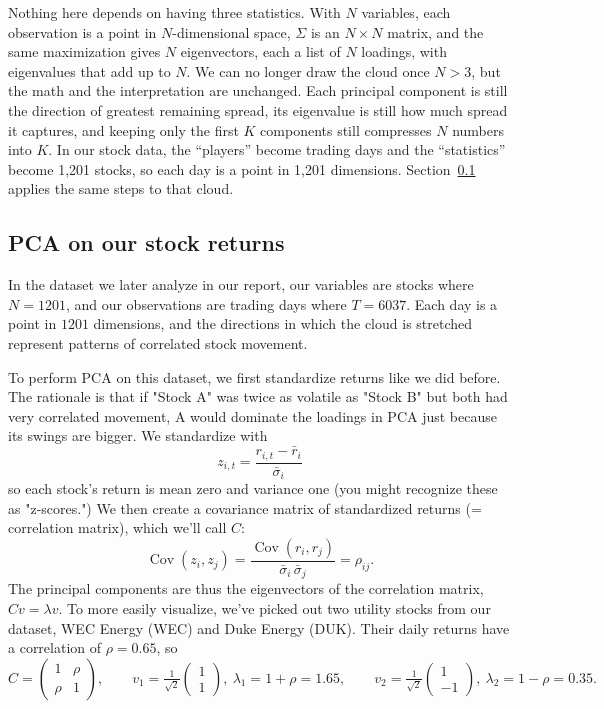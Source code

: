 \documentclass[11pt,letterpaper]{article}
\begin{document}
Nothing here depends on having three statistics. With $N$ variables, each
observation is a point in $N$-dimensional space, $\Sigma$ is an $N\times N$
matrix, and the same maximization gives $N$ eigenvectors, each a list of $N$
loadings, with eigenvalues that add up to $N$. We can no longer draw the
cloud once $N>3$, but the math and the interpretation are unchanged. Each
principal component is still the direction of greatest remaining spread, its
eigenvalue is still how much spread it captures, and keeping only the first
$K$ components still compresses $N$ numbers into $K$. In our stock data, the
``players'' become trading days and the ``statistics'' become 1,201 stocks,
so each day is a point in 1,201 dimensions. Section~\ref{sec:stock-pca}
applies the same steps to that cloud.
\subsection{PCA on our stock returns}
\label{sec:stock-pca}
In the dataset we later analyze in our report, our variables are stocks where $N = 1201$, and our observations are trading days where $T = 6037$. Each day is a point in $1201$ dimensions, and the directions in which the cloud is stretched represent patterns of correlated stock movement.

To perform PCA on this dataset, we first standardize returns like we did before. The rationale is that if  "Stock A" was twice as volatile as "Stock B" but both had very correlated movement, A would dominate the loadings in PCA just because its swings are bigger. We standardize with 
\[
z_{i,t}=\frac{r_{i,t}-\bar{r}_i}{\bar{\sigma}_i}
\]
so each stock's return is mean zero and variance one (you might recognize these as "z-scores.") We then create a covariance matrix of standardized returns (= correlation matrix), which we'll call $C$:
\[
\operatorname{Cov}(z_i,z_j)=\frac{\operatorname{Cov}(r_i,r_j)}{\bar\sigma_i\,\bar\sigma_j}=\rho_{ij}.
\]
The principal components are thus the eigenvectors of the correlation matrix, $Cv=\lambda v$. To more easily visualize, we've picked out two utility stocks from our dataset, WEC Energy (WEC) and Duke Energy (DUK). Their daily returns have a correlation of $\rho=0.65$, so
\[
C=\begin{pmatrix}1&\rho\\ \rho&1\end{pmatrix},\qquad
v_1=\tfrac{1}{\sqrt2}\begin{pmatrix}1\\1\end{pmatrix},\ \lambda_1=1+\rho=1.65,
\qquad
v_2=\tfrac{1}{\sqrt2}\begin{pmatrix}1\\-1\end{pmatrix},\ \lambda_2=1-\rho=0.35.
\]
\end{document}
